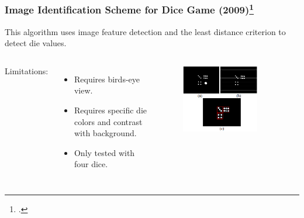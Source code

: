 \documentclass{beamer}
\begin{document}
\begin{frame}
\frametitle{Image Identification Scheme for Dice Game (2009)\footcite{Chung2009}}

This algorithm uses image feature detection and the least distance criterion to detect die values.

\vspace{\baselineskip}

\begin{columns}


Limitations:
\begin{itemize}
	\item Requires birds-eye view.
	\item Requires specific die colors and contrast with background.
	\item Only tested with four dice.
\end{itemize}


\begin{figure}
	\centering
	\includegraphics[width=0.8\textwidth]{prior_4a}
\end{figure}

\end{columns}
	
\end{frame}



\end{document}
